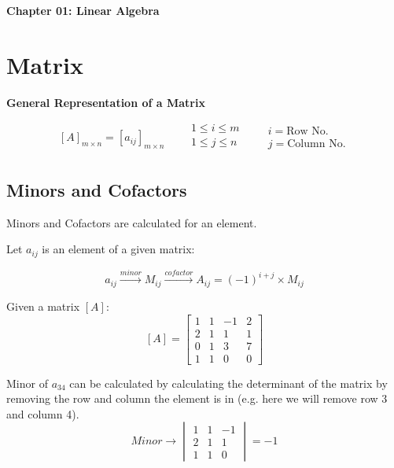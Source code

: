 \begin{center}
\Large \textbf{Chapter 01: Linear Algebra}
\end{center}

\section{Matrix}

\textbf{General Representation of a Matrix}

$$  [A]_{m \times n} = [a_{ij}]_{m \times n} \quad \quad
    \begin{array}{|c|}
    1 \leqslant i \leqslant m \\
    1 \leqslant j \leqslant n \\
    \end{array} \quad
    \begin{aligned}
    &i = \text{Row No.} \\
    &j = \text{Column No.}
    \end{aligned}
$$

\subsection{Minors and Cofactors}

Minors and Cofactors are calculated for an element.

\vspace{0.2cm}

Let $a_{ij}$ is an element of a given matrix:

$$ a_{ij} \xrightarrow{minor} M_{ij} \xrightarrow{cofactor} A_{ij} = (-1)^{i+j} \times M_{ij} $$

Given a matrix $[A]$:
$$  [A] = \begin{bmatrix}
    1 & 1 & -1 & 2 \\
    2 & 1 & 1 & 1 \\
    0 & 1 & 3 & 7 \\
    1 & 1 & 0 & 0
    \end{bmatrix}
$$

Minor of $a_{34}$ can be calculated by calculating the determinant of the matrix by removing the row and column the element is in (e.g. here we will remove row 3 and column 4).
$$  Minor \longrightarrow \begin{vmatrix}
    1 & 1 & -1 \\
    2 & 1 & 1 \\
    1 & 1 & 0
    \end{vmatrix} = -1
$$

